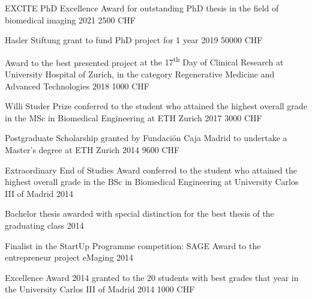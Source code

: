 


\begin{cvhonors}

\cvhonor
{EXCITE PhD Excellence Award} %
{for outstanding PhD thesis in the field of biomedical imaging} %
{2021} %
{2500 CHF}

\cvhonor
{Hasler Stiftung grant} %
{to fund PhD project for 1 year} %
{2019} %
{50000 CHF}

\cvhonor
{Award to the best presented project} %
{at the 17\textsuperscript{th} Day of Clinical Research at University Hospital of Zurich, in the category Regenerative Medicine and Advanced Technologies} %
{2018} %
{1000 CHF}

\cvhonor
{Willi Studer Prize} %
{conferred to the student who attained the highest overall grade in the MSc in Biomedical Engineering at ETH Zurich} %
{2017} %
{3000 CHF}


\cvhonor
{Postgraduate Scholarship}
{granted by Fundación Caja Madrid to undertake a Master's degree at ETH Zurich}
{2014} %
{9600 CHF}


\cvhonor
{Extraordinary End of Studies Award} %
{conferred to the student who attained the highest overall grade in the BSc in Biomedical Engineering at University Carlos III of Madrid} %
{2014} %
{}


\cvhonor
{Bachelor thesis awarded with special distinction} %
{for the best thesis of the graduating class} %
{2014} %
{}

\cvhonor
{Finalist in the StartUp Programme competition: SAGE Award}
{to the entrepreneur project eMaging}
{2014} %
{}

\cvhonor
{Excellence Award 2014}
{granted to the 20 students with best grades that year in the University Carlos III of Madrid}
{2014} %
{1000 CHF}


\end{cvhonors}
